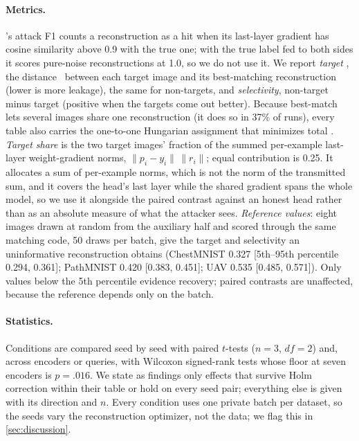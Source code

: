 \paragraph{Metrics.}
\geminio's attack F1 counts a reconstruction as a hit when its last-layer gradient has cosine similarity above 0.9 with the true one; with the true label fed to both sides it scores pure-noise reconstructions at 1.0, so we do not use it.
We report \emph{target \lpips}, the \lpips distance~\cite{lpips2018} between each target image and its best-matching reconstruction (lower is more leakage), the same for non-targets, and \emph{selectivity}, non-target minus target \lpips (positive when the targets come out better).
Because best-match lets several images share one reconstruction (it does so in 37\% of runs), every table also carries the one-to-one Hungarian assignment that minimizes total \lpips.
\emph{Target share} is the two target images' fraction of the summed per-example last-layer weight-gradient norms, $\|p_i-y_i\|\,\|r_i\|$; equal contribution is 0.25. It allocates a sum of per-example norms, which is not the norm of the transmitted sum, and it covers the head's last layer while the shared gradient spans the whole model, so we use it alongside the paired contrast against an honest head rather than as an absolute measure of what the attacker sees.
\emph{Reference values}: eight images drawn at random from the auxiliary half and scored through the same matching code, 50 draws per batch, give the target \lpips and selectivity an uninformative reconstruction obtains (ChestMNIST 0.327 [5th--95th percentile 0.294, 0.361]; PathMNIST 0.420 [0.383, 0.451]; UAV 0.535 [0.485, 0.571]). Only values below the 5th percentile evidence recovery; paired contrasts are unaffected, because the reference depends only on the batch.

\paragraph{Statistics.}
Conditions are compared seed by seed with paired $t$-tests ($n=3$, $df=2$) and, across encoders or queries, with Wilcoxon signed-rank tests whose floor at seven encoders is $p=.016$.
We state as findings only effects that survive Holm correction within their table or hold on every seed pair; everything else is given with its direction and $n$.
Every condition uses one private batch per dataset, so the seeds vary the reconstruction optimizer, not the data; we flag this in \cref{sec:discussion}.
